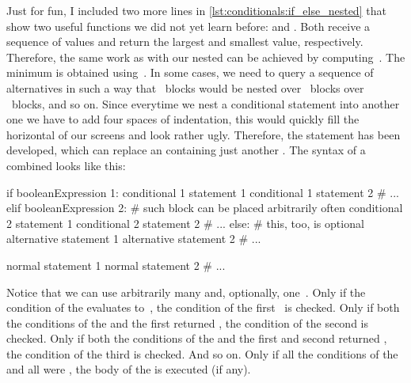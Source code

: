 Just for fun, I included two more lines in \cref{lst:conditionals:if_else_nested} that show two useful functions we did not yet learn before:
 and .
Both receive a sequence of values and return the largest and smallest value, respectively.
Therefore, the same work as with our nested  can be achieved by computing~.
The minimum is obtained using~.%
\FloatBarrier%
\endhsection%
%
%
%
%
%
%
%
%
%
%
In some cases, we need to query a sequence of alternatives in such a way that ~blocks would be nested over ~blocks over ~blocks, and so on.
Since everytime we nest a conditional statement into another one we have to add four spaces of indentation, this would quickly fill the horizontal of our screens and look rather ugly.
Therefore, the  statement has been developed, which can replace an  containing just another .
The syntax of a combined  looks like this:%
%
\begin{pythonSyntax}
if booleanExpression 1:
    conditional 1 statement 1
    conditional 1 statement 2
    # ...
elif booleanExpression 2:  # such block can be placed arbitrarily often
    conditional 2 statement 1
    conditional 2 statement 2
    # ...
else:  # this, too, is optional
    alternative statement 1
    alternative statement 2
    # ...

normal statement 1
normal statement 2
# ...
\end{pythonSyntax}
%
Notice that we can use arbitrarily many  and, optionally, one~.
Only if the condition of the  evaluates to~, the condition of the first~ is checked.
Only if both the conditions of the  and the first  returned , the condition of the second  is checked.
Only if both the conditions of the  and the first and second  returned , the condition of the third  is checked.
And so on.
Only if all the conditions of the  and all  were , the body of the  is executed (if any).

